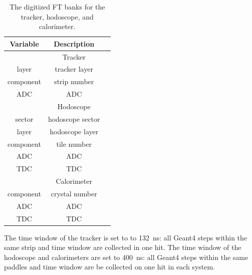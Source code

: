 \begin{table}[h]
	\begin{center}
		\begin{tabular}{| c | c | c |}
			\hline \hline
			Variable            & Description      \\
			\hline
		                         & Tracker         \\
			\hline
                          layer  &      tracker layer \\
                      component  &  strip number      \\
                            ADC  &        ADC         \\
			\hline
		                         & Hodoscope          \\
			\hline
						 sector  &     hodoscope sector  \\
                          layer  &      hodoscope layer  \\
                      component  &  tile number    \\
                            ADC  &        ADC      \\
                            TDC  &        TDC      \\
			\hline
								 & Calorimeter     \\
			\hline
					  component  &  crystal number \\
							ADC  &        ADC      \\
							TDC  &        TDC      \\
			\hline \hline
		\end{tabular}
	\end{center}
	\caption{The digitized FT banks for the tracker, hodoscope, and calorimeter.}
        \label{tab:ftBank}
\end{table}

\noindent The time window  of the tracker is set to to 132~ns: all Geant4 steps within the same strip and time window
are collected in one hit. The time window of the hodoscope and calorimeters are set to 400~ns: all Geant4 steps within
the same paddles and time window are be collected on one hit in each system.
